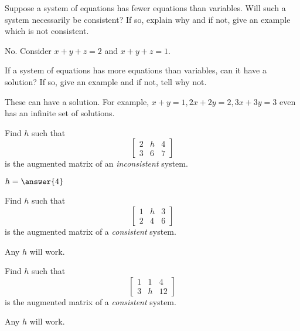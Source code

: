 \documentclass{ximera}
\begin{document}
\begin{problem}\label{prb:2.8}
Suppose a system of equations has fewer equations than variables. Will such a system necessarily be consistent? If so, explain why and if not, give an example
which is not consistent.
\begin{hint}
No. Consider $x+y+z=2$ and $x+y+z=1.$
\end{hint}
\end{problem}

\begin{problem}\label{prb:2.9}
If a system of equations has more equations than variables, can it
have a solution? If so, give an example and if not, tell why not.
\begin{hint}
These can
have a solution. For example, $x+y=1,2x+2y=2,3x+3y=3$ even has an infinite
set of solutions.
\end{hint}
\end{problem}

\begin{problem}\label{prb:2.10}
Find $h$ such that
\begin{equation*}
\left[
\begin{array}{rr|r}
2 & h & 4 \\
3 & 6 & 7
\end{array}
\right]
\end{equation*}
is the augmented matrix of an \textit{inconsistent} system.

$h=\answer{4}$

\end{problem}

\begin{problem}\label{prb:2.11}
Find $h$ such that
\begin{equation*}
\left[
\begin{array}{rr|r}
1 & h & 3 \\
2 & 4 & 6
\end{array}
\right]
\end{equation*}
is the augmented matrix of a \textit{consistent} system.
\begin{hint}
 Any $h$ will work.
\end{hint}
\end{problem}

\begin{problem}\label{prb:2.12}
Find $h$ such that
\begin{equation*}
\left[
\begin{array}{rr|r}
1 & 1 & 4 \\
3 & h & 12
\end{array}
\right]
\end{equation*}
is the augmented matrix of a \textit{consistent} system.
\begin{hint}
 Any $h$ will work.
\end{hint}
\end{problem}
\end{document}

